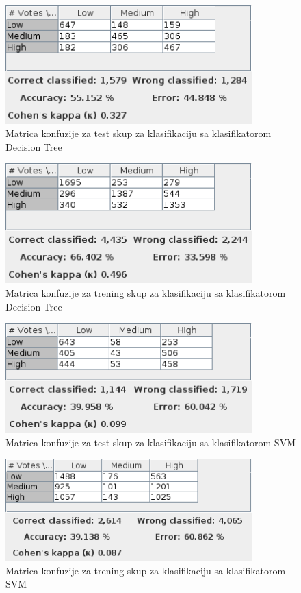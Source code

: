 \documentclass[11pt]{article} %
\begin{document}
\begin{figure}[h!]
	\centering
	\includegraphics[width=0.85\textwidth]{votesClassificationTest/DecisionTree}
	\caption{Matrica konfuzije za test skup za klasifikaciju sa klasifikatorom Decision Tree}
\end{figure}
\begin{figure}[h!]
	\centering
	\includegraphics[width=0.85\textwidth]{votesClassificationTraining/DecisionTree}
	\caption{Matrica konfuzije za trening skup za klasifikaciju sa klasifikatorom Decision Tree}
\end{figure}
\newline
\begin{figure}[h!]
	\centering
	\includegraphics[width=0.85\textwidth]{votesClassificationTest/SVM}
	\caption{Matrica konfuzije za test skup za klasifikaciju sa klasifikatorom SVM}
\end{figure}
\begin{figure}[h!]
	\centering
	\includegraphics[width=0.85\textwidth]{votesClassificationTraining/SVM}
	\caption{Matrica konfuzije za trening skup za klasifikaciju sa klasifikatorom SVM}
\end{figure}
\end{document}
